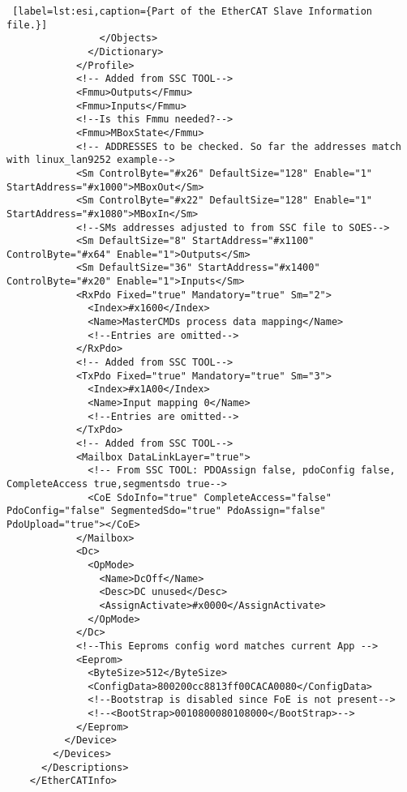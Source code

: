 \begin{lstlisting} [label=lst:esi,caption={Part of the EtherCAT Slave Information file.}]
                </Objects>
              </Dictionary>
            </Profile>
            <!-- Added from SSC TOOL-->
            <Fmmu>Outputs</Fmmu>
            <Fmmu>Inputs</Fmmu>
            <!--Is this Fmmu needed?-->
            <Fmmu>MBoxState</Fmmu>
            <!-- ADDRESSES to be checked. So far the addresses match with linux_lan9252 example-->
            <Sm ControlByte="#x26" DefaultSize="128" Enable="1" StartAddress="#x1000">MBoxOut</Sm>
            <Sm ControlByte="#x22" DefaultSize="128" Enable="1" StartAddress="#x1080">MBoxIn</Sm>
            <!--SMs addresses adjusted to from SSC file to SOES-->
            <Sm DefaultSize="8" StartAddress="#x1100" ControlByte="#x64" Enable="1">Outputs</Sm>
            <Sm DefaultSize="36" StartAddress="#x1400" ControlByte="#x20" Enable="1">Inputs</Sm>
            <RxPdo Fixed="true" Mandatory="true" Sm="2">
              <Index>#x1600</Index>
              <Name>MasterCMDs process data mapping</Name>
              <!--Entries are omitted-->
            </RxPdo>
            <!-- Added from SSC TOOL-->
            <TxPdo Fixed="true" Mandatory="true" Sm="3">
              <Index>#x1A00</Index>
              <Name>Input mapping 0</Name>
              <!--Entries are omitted-->
            </TxPdo>
            <!-- Added from SSC TOOL-->
            <Mailbox DataLinkLayer="true">
              <!-- From SSC TOOL: PDOAssign false, pdoConfig false, CompleteAccess true,segmentsdo true-->
              <CoE SdoInfo="true" CompleteAccess="false" PdoConfig="false" SegmentedSdo="true" PdoAssign="false" PdoUpload="true"></CoE>
            </Mailbox>
            <Dc>
              <OpMode>
                <Name>DcOff</Name>
                <Desc>DC unused</Desc>
                <AssignActivate>#x0000</AssignActivate>
              </OpMode>
            </Dc>
            <!--This Eeproms config word matches current App -->
            <Eeprom>
              <ByteSize>512</ByteSize>
              <ConfigData>800200cc8813ff00CACA0080</ConfigData>
              <!--Bootstrap is disabled since FoE is not present-->
              <!--<BootStrap>0010800080108000</BootStrap>-->
            </Eeprom>
          </Device>
        </Devices>
      </Descriptions>
    </EtherCATInfo>
\end{lstlisting}